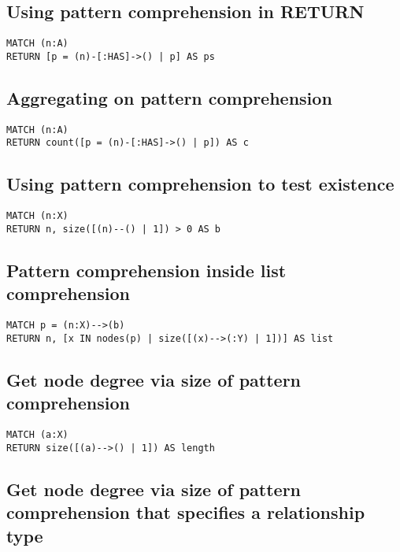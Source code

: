 \subsection{Using pattern comprehension in RETURN}

\begin{lstlisting}
MATCH (n:A)
RETURN [p = (n)-[:HAS]->() | p] AS ps
\end{lstlisting}

\subsection{Aggregating on pattern comprehension}

\begin{lstlisting}
MATCH (n:A)
RETURN count([p = (n)-[:HAS]->() | p]) AS c
\end{lstlisting}

\subsection{Using pattern comprehension to test existence}

\begin{lstlisting}
MATCH (n:X)
RETURN n, size([(n)--() | 1]) > 0 AS b
\end{lstlisting}

\subsection{Pattern comprehension inside list comprehension}

\begin{lstlisting}
MATCH p = (n:X)-->(b)
RETURN n, [x IN nodes(p) | size([(x)-->(:Y) | 1])] AS list
\end{lstlisting}

\subsection{Get node degree via size of pattern comprehension}

\begin{lstlisting}
MATCH (a:X)
RETURN size([(a)-->() | 1]) AS length
\end{lstlisting}

\subsection{Get node degree via size of pattern comprehension that specifies a relationship type}

